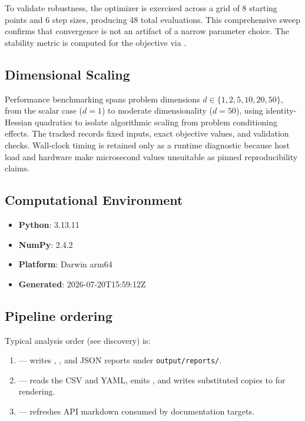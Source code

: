\documentclass[
  english,
]{article}
\providecommand{\tightlist}{%
  \setlength{\itemsep}{0pt}\setlength{\parskip}{0pt}}
\begin{document}
To validate robustness, the optimizer is exercised across a grid of 8
starting points and 6 step sizes, producing 48 total evaluations. This
comprehensive sweep confirms that convergence is not an artifact of a
narrow parameter choice. The stability metric is computed for the
 objective via
.

\subsection{Dimensional Scaling}\label{dimensional-scaling}

Performance benchmarking spans problem dimensions
\(d \in \{1, 2, 5, 10, 20, 50\}\), from the scalar case (\(d = 1\)) to
moderate dimensionality (\(d = 50\)), using identity-Hessian quadratics
to isolate algorithmic scaling from problem conditioning effects. The
tracked  records
fixed inputs, exact objective values, and validation checks. Wall-clock
timing is retained only as a runtime diagnostic because host load and
hardware make microsecond values unsuitable as pinned reproducibility
claims.

\subsection{Computational Environment}\label{computational-environment}

\begin{itemize}
\tightlist
\item
  \textbf{Python}: 3.13.11
\item
  \textbf{NumPy}: 2.4.2
\item
  \textbf{Platform}: Darwin arm64
\item
  \textbf{Generated}: 2026-07-20T15:59:12Z
\end{itemize}

\subsection{Pipeline ordering}\label{pipeline-ordering}

Typical  analysis order (see
 discovery) is:

\begin{enumerate}
\def\labelenumi{\arabic{enumi}.}
\tightlist
\item
   --- writes
  ,
  , and JSON reports under
  \texttt{output/reports/}.
\item
   --- reads the CSV and
  YAML, emits , and
  writes substituted copies to  for
  rendering.
\item
   --- refreshes API markdown consumed by
  documentation targets.
\end{enumerate}
\end{document}

